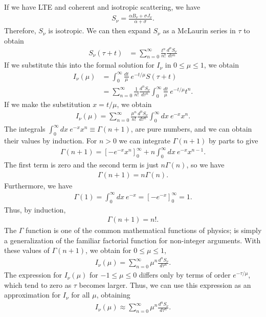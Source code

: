 If we have LTE and coherent and isotropic scattering, we have
\begin{align}
\label{equation:diffusion-approximation-source-function}
S_\nu = \frac{\alpha B_\nu + \sigma J_\nu}{\alpha + \sigma}.
\end{align}
Therefore, $S_\nu$ is isotropic.
We can then expand $S_\nu$ as a
McLaurin series in $\tau$ to obtain
\begin{align}
S_\nu(\tau + t) &=
\sum_{n=0}^\infty \frac{t^n}{n!}\frac{d^n\!S_\nu}{d\tau^n }
\end{align}
If we substitute this into the formal solution for $I_\nu$
in $0 \le \mu \le 1$, we obtain
\begin{align}
I_\nu(\mu) 
&=
\int_0^\infty\!\!\!\frac{dt}{\mu}\: 
e^{-t/\mu}S(\tau+t)\\
&=
\sum_{n=0}^\infty \frac{1}{n!}\frac{d^n\!S_\nu}{d\tau^n}
\int_0^\infty\!\frac{dt}{\mu}\:e^{-t/\mu}t^n.
\end{align}
If we make the substitution $x = t/\mu$, we obtain
\begin{align}
I_\nu(\mu) 
=
\sum_{n=0}^\infty \frac{\mu^n}{n!}\frac{d^n\!S_\nu}{d\tau^n} 
\int_0^\infty\!\!\!dx\:e^{-x}x^n.
\end{align}
The integrals $\int_0^\infty dx\:e^{-x}x^n \equiv \Gamma(n+1)$, are
pure numbers, and we can obtain their values by induction.
For $n > 0$ we can integrate $\Gamma(n+1)$ by parts to give
\begin{align}
\Gamma(n+1) = \left[-e^{-x}x^n\right]_0^\infty 
+ n
\int_0^\infty\!\!\!dx\:e^{-x}x^{n-1}.
\end{align}
The first term is zero and the second term is just
$n\Gamma(n)$, so we have
\begin{align}
\Gamma(n+1) = n \Gamma(n).
\end{align}
Furthermore, we have 
\begin{align}
\Gamma(1) = \int_0^\infty dx\:e^{-x} = \left[-e^{-x}\right]_0^\infty = 1.
\end{align}
Thus, by induction, 
\begin{align}
\Gamma(n+1) = n!.
\end{align}
The $\Gamma$ function is one of the common mathematical
functions of physics; is simply a generalization of the
familiar factorial function for non-integer arguments. 
With
these values of $\Gamma(n+1)$, we obtain for $0 \le \mu \le 1$,
\begin{align}
I_\nu(\mu) 
=
\sum_{n=0}^\infty \mu^n \frac{d^n S_\nu}{d\tau^n}.
\end{align}
The expression for $I_\nu(\mu)$ for $-1 \le \mu \le 0$
differs only by terms of order $e^{-\tau/\mu}$, which
tend to zero as $\tau$ becomes larger. Thus, we can use this
expression as an approximation for $I_\nu$ for all $\mu$, obtaining
\begin{align}
\label{equation-i-in-diffusion-approximation}
I_\nu(\mu) 
\approx
\sum_{n=0}^\infty \mu^n \frac{d^n S_\nu}{d\tau^n}.
\end{align}

